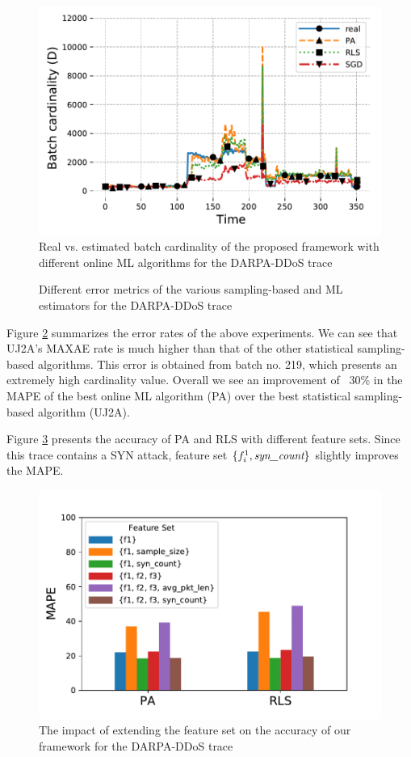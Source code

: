 		\begin{figure}[!tb]
			\centering
			\includegraphics[width=.95\linewidth]{img/darpa-ddos_online_ml_paper.pdf}
			\caption{Real vs. estimated batch cardinality of the proposed framework with different online ML algorithms for the DARPA-DDoS trace}
			\label{fig:darpa-ddos_online_ml}
		\end{figure}
	
		\begin{figure}
			\centering
			\small
			
			\caption{Different error metrics of the various sampling-based and ML estimators for the DARPA-DDoS trace}
			\label{fig:darpa-ddos_error}
		\end{figure}
		
		Figure \ref{fig:darpa-ddos_error} summarizes the error rates of the above experiments. We can see that UJ2A's MAXAE rate is much higher than that of the other statistical sampling-based algorithms. This error is obtained from batch no. 219, which presents an extremely high cardinality value. Overall we see an improvement of ~30\% in the MAPE of the best online ML algorithm (PA) over the best statistical sampling-based algorithm (UJ2A).
		
		Figure \ref{fig:darpa-ddos_features} presents the accuracy of PA and RLS with different feature sets. Since this trace contains a SYN attack, feature set $\{f_i^1, \emph{syn\_count}\}$ slightly improves the MAPE.
		
		\begin{figure}[!tb]
			\centering
			\includegraphics[width=.49\textwidth]{img/darpa-ddos_features.pdf}
			\caption{The impact of extending the feature set on the accuracy of our framework for the DARPA-DDoS trace}
			\label{fig:darpa-ddos_features}
		\end{figure}


